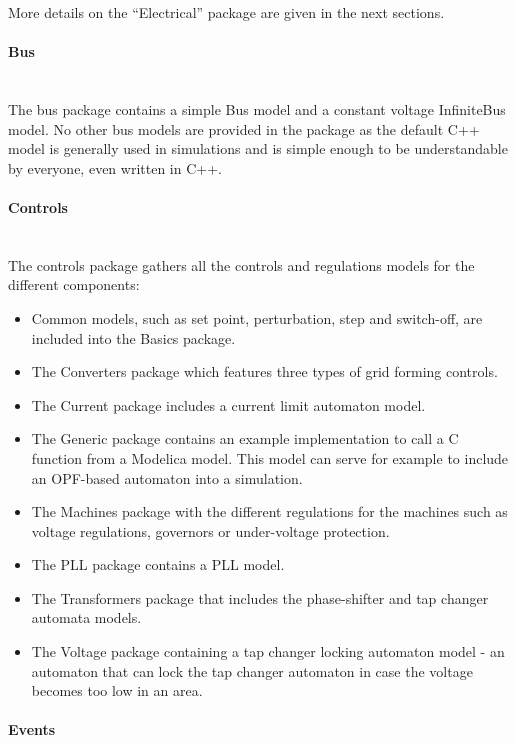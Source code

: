 \documentclass[a4paper, 12pt]{report}
\begin{document}
More details on the ``Electrical'' package are given in the next sections.

\paragraph{Bus}
~~\\

The bus package contains a simple Bus model and a constant voltage InfiniteBus model. No other bus models are provided in the package as the default C++ model is generally used in \Dynawo simulations and is simple enough to be understandable by everyone, even written in C++.

\paragraph{Controls}
~~\\

The controls package gathers all the controls and regulations models for the different components:
\begin{itemize}
\item Common models, such as set point, perturbation, step and switch-off, are included into the Basics package.
\item The Converters package which features three types of grid forming controls.
\item The Current package includes a current limit automaton model.
\item The Generic package contains an example implementation to call a C function from a Modelica model. This model can serve for example to include an OPF-based automaton into a \Dynawo simulation.
\item The Machines package with the different regulations for the machines such as voltage  regulations, governors or under-voltage protection.
\item The \ac{PLL} package contains a \ac{PLL} model.
\item The Transformers package that includes the phase-shifter and tap changer automata models.
\item The Voltage package containing a tap changer locking automaton model - an automaton that can lock the tap changer automaton in case the voltage becomes too low in an area.
\end{itemize}

\paragraph{Events}
~~\\
\end{document}
